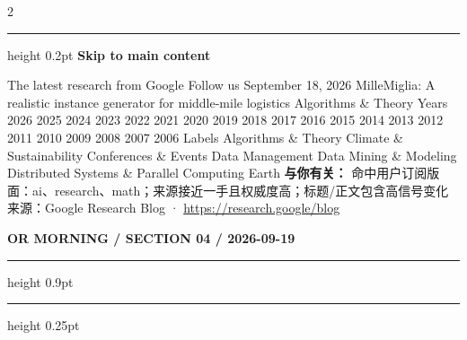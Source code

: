 \documentclass[10.5pt]{ctexart}
\begin{document}
\begin{multicols}{2}
\vspace{2mm}
\hrule height 0.2pt
\vspace{2mm}
{\large\bfseries Skip to main content}\par
The latest research from Google Follow us September 18, 2026 MilleMiglia: A realistic instance generator for middle-mile logistics Algorithms \& Theory Years 2026 2025 2024 2023 2022 2021 2020 2019 2018 2017 2016 2015 2014 2013 2012 2011 2010 2009 2008 2007 2006 Labels Algorithms \& Theory Climate \& Sustainability Conferences \& Events Data Management Data Mining \& Modeling Distributed Systems \& Parallel Computing Earth
\textbf{与你有关：} 命中用户订阅版面：ai、research、math；来源接近一手且权威度高；标题/正文包含高信号变化
{\footnotesize\color{ormuted} 来源：Google Research Blog · \url{https://research.google/blog}}
\end{multicols}
\newpage
{\small\bfseries OR MORNING / SECTION 04 / 2026-09-19}
\vspace{2mm}
\hrule height 0.9pt
\vspace{1.5mm}
\hrule height 0.25pt
\vspace{4mm}
\end{document}
